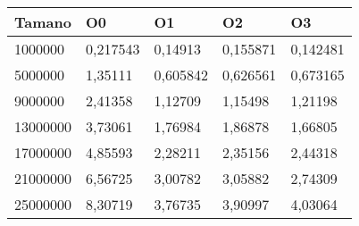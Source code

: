 \begin{tabular}{|l|l|l|l|l|}
	\hline
	Tamano & O0 & O1 & O2 & O3 \\
	\hline
	\hline
	1000000 & 0,217543 & 0,14913 & 0,155871 & 0,142481 \\
	\hline
	5000000 & 1,35111 & 0,605842 & 0,626561 & 0,673165 \\
	\hline
	9000000 & 2,41358 & 1,12709 & 1,15498 & 1,21198 \\
	\hline
	13000000 & 3,73061 & 1,76984 & 1,86878 & 1,66805 \\
	\hline
	17000000 & 4,85593 & 2,28211 & 2,35156 & 2,44318 \\
	\hline
	21000000 & 6,56725 & 3,00782 & 3,05882 & 2,74309 \\
	\hline
	25000000 & 8,30719 & 3,76735 & 3,90997 & 4,03064 \\
	\hline
\end{tabular}
